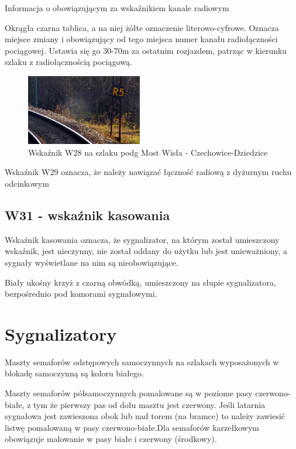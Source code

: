 \begin{tcolorbox}[colback=black!5!white,colframe=white!55!black,title=Wskaźnik W28]Informacja o obowiązującym za wskaźnikiem kanale radiowym
\end{tcolorbox}
Okrągła czarna tablica, a na niej żółte oznaczenie literowo-cyfrowe. Oznacza miejsce zmiany i obowiązujący od tego miejsca numer kanału radiołączności pociągowej. Ustawia się go 30-70m za ostatnim rozjazdem, patrząc w kierunku szlaku z radiołącznością pociągową.
\begin{figure}
		\includegraphics[width=0.45\textwidth]{skryptkierownik-img/skryptkierownik-img019.jpg}
		\caption{Wskaźnik W28 na szlaku podg Most Wisła - Czechowice-Dziedzice}
		\label{fig:w28}
\end{figure}

Wskaźnik W29 oznacza, że należy nawiązać łączność radiową z dyżurnym ruchu odcinkowym

\subsection{W31 - wskaźnik kasowania}
\begin{tcolorbox}[colback=black!5!white,colframe=white!55!black,title=Wskaźnik W31]
{\textquotedbl}Wskaźnik kasowania{\textquotedbl} oznacza, że sygnalizator, na którym został umieszczony wskaźnik, jest nieczynny, nie został oddany do użytku lub jest unieważniony, a sygnały wyświetlane na nim są nieobowiązujące.
\end{tcolorbox}
Biały ukośny krzyż z czarną obwódką, umieszczony na słupie sygnalizatora, bezpośrednio pod komorami sygnałowymi.

\section{Sygnalizatory}

Maszty semaforów odstępowych samoczynnych na szlakach wyposażonych w blokadę samoczynną są koloru białego.

Maszty semaforów półsamoczynnych pomalowane są w poziome pasy czerwono-białe, z tym że pierwszy pas od dołu masztu jest czerwony. Jeśli latarnia sygnałowa jest zawieszona obok lub nad torem (na bramce) to należy zawiesić listwę pomalowaną
w pasy czerwono-białe.Dla semaforów karzełkowym obowiązuje malowanie w pasy białe i czerwony (środkowy).

